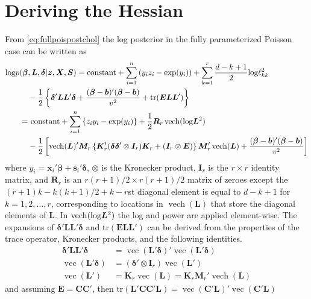 \documentclass[12pt]{article}
\def\log{\hbox{log}}
\DeclareMathOperator{\vect}{vec}
\DeclareMathOperator{\vech}{vech}
\begin{document}
\section{Deriving the Hessian}\label{sec:hess}
From \eqref{eq:fullpoispostchol} the log posterior in the fully parameterized Poisson case can be written as
\begin{align*}
\log p(\bm{\beta}&, \bm{L}, \bm{\delta}|\bm{z}, \bm{X}, \bm{S}) = \mathrm{constant}+ \sum_{i=1}^n\left(y_iz_i - \exp(y_i)\right) + \sum_{k=1}^r \frac{d - k + 1}{2}\log\ell_{kk}^2\\
& - \frac{1}{2}\left\{\bm{\delta}'\bm{L}\bm{L}'\bm{\delta}+\frac{(\bm{\beta} - \bm{b})'(\bm{\beta} - \bm{b})}{v^2} + \mathrm{tr}(\bm{E}\bm{L}\bm{L}')\right\}\\ 
=&\ \mathrm{constant} + \sum_{i=1}^n \left\{z_iy_i - \exp(y_i)\right\} + \frac{1}{2}\bm{R}_r\vech(\log\bm{L}^2)\\
&  -\frac{1}{2}\left[\vech(\bm{L})'\bm{M}_r\left\{\bm{K}_r'(\bm{\delta}\bm{\delta}'\otimes \bm{I}_r)\bm{K}_r + (\bm{I}_r\otimes \bm{E})\right\}\bm{M}_r'\vech(\bm{L})+\frac{(\bm{\beta}-\bm{b})'(\bm{\beta}-\bm{b})}{v^2}\right]
\end{align*}
where $y_i = \bm{x}_i'\bm{\beta} + \bm{s}_i'\bm{\delta}$, $\otimes$ is the Kronecker product, $\bm{I}_r$ is the $r\times r$ identity matrix, and $\bm{R}_r$ is an $r(r+1)/2\times r(r+1)/2$ matrix of zeroes except the $(r + 1)k - k(k+1)/2 + k - r$st diagonal element is equal to $d - k + 1$ for $k=1, 2, \dots, r$, corresponding to locations in $\vech(\bm{L})$ that store the diagonal elements of $\bm{L}$. In $\vech(\log\bm{L}^2)$ the log and power are applied element-wise. The expansions of $\bm{\delta}'\bm{L}\bm{L}'\bm{\delta}$ and $\mathrm{tr}(\bm{E}\bm{L}\bm{L}')$ can be derived from the properties of the trace operator, Kronecker products, and the following identities.
\begin{align*}
\bm{\delta}'\bm{L}\bm{L}'\bm{\delta}& = \vect(\bm{L}'\bm{\delta})'\vect(\bm{L}'\bm{\delta})\\ 
\vect(\bm{L}'\bm{\delta})& = (\bm{\delta}'\otimes \bm{I}_r)\vect(\bm{L}')\\
\vect(\bm{L}')& = \bm{K}_r\vect(\bm{L}) = \bm{K}_r\bm{M}_r'\vech(\bm{L})
\end{align*}
and assuming $\bm{E} = \bm{C}\bm{C}'$, then $\mathrm{tr}(\bm{L'}\bm{C}\bm{C}'\bm{L}) = \vect(\bm{C}'\bm{L})'\vect(\bm{C}'\bm{L})$
\end{document}

